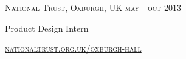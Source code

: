 {
  \textsc{\small{National Trust, Oxburgh, UK
    \hfill
      {\raggedleft
        may - oct 2013
      } \\
    }
  }
  {\raggedright\large {
    Product Design Intern
  } \\}

  \textsc{\small\href{http://www.nationaltrust.org.uk/oxburgh-hall}{nationaltrust.org.uk/oxburgh-hall}}
}
